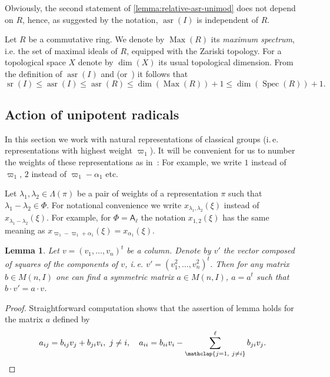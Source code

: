 \documentclass[11pt]{amsart}
\theoremstyle{plain}
\numberwithin{equation}{section}
\newtheorem{lemma}{Lemma}
\numberwithin{lemma}{section}
\theoremstyle{definition}
\theoremstyle{remark}
\DeclareMathOperator{\sr}{sr}
\DeclareMathOperator{\asr}{asr}
\DeclareMathOperator{\Max}{Max}
\DeclareMathOperator{\Spec}{Spec}
\newcommand{\rA}{\mathsf{A}}
\begin{document}
Obviously, the second statement of \cref{lemma:relative-asr-unimod} does not depend on $R$, hence, as suggested by the notation, $\asr(I)$ is independent of $R$.

Let $R$ be a commutative ring. We denote by $\Max(R)$ its \emph{maximum spectrum}, i.e. the set of maximal ideals of $R$, equipped with the Zariski topology. For a topological space $X$ denote by $\dim(X)$ its usual topological dimension.
From the definition of $\asr(I)$ and \cite[Theorem~2.3]{EO} (or~\cite[Theorem~3.7]{MKV}) it follows that
\begin{equation} \label{sr-estimates} \sr(I)\leqslant\asr(I)\leqslant\asr(R)\leqslant \dim(\Max(R))+1\leqslant\dim(\Spec(R))+1. \end{equation}

\subsection{Action of unipotent radicals}\label{sec:ur-action}
In this section we work with natural representations of classical groups (i.\,e. representations with highest weight $\varpi_1$).
It will be convenient for us to number the weights of these representations as in~\cite[\S~1B]{St78}:
For example, we write $1$ instead of $\varpi_1$, $2$ instead of $\varpi_1-\alpha_1$ etc.

Let $\lambda_1, \lambda_2 \in \Lambda(\pi)$ be a pair of weights of a representation $\pi$ such that $\lambda_1-\lambda_2\in \Phi$.
For notational convenience we write $x_{\lambda_1, \lambda_2}(\xi)$ instead of $x_{\lambda_1-\lambda_2}(\xi)$.
For example, for $\Phi=\rA_\ell$ the notation $x_{1, 2}(\xi)$ has the same meaning as $x_{\varpi_1 - \varpi_1 + \alpha_1}(\xi) = x_{\alpha_1}(\xi)$.

\begin{lemma}\label{lemma:PSV-symplectic-trick}
 Let $v=(v_1, \ldots, v_n)^t$ be a column. Denote by $v'$ the vector composed of squares of the components of $v$, i.\,e. $v'=(v_1^2, \ldots, v_n^2)^t$.
 Then for any matrix $b \in M(n, I)$ one can find a symmetric matrix $a \in M(n, I)$, $a=a^t$ such that $b \cdot v' = a \cdot v$. \end{lemma}
\begin{proof}
Straightforward computation shows that the assertion of lemma holds for the matrix $a$ defined by
\begin{equation*}
a_{ij} = b_{ij} v_{j} + b_{ji} v_{i},\ j\neq i,\quad a_{ii} = b_{ii} v_{i} - \sum\limits_{\mathclap{j=1,\ j\neq i}}^\ell b_{ji} v_{j}. \qedhere
\end{equation*}
\end{proof}
\end{document}
